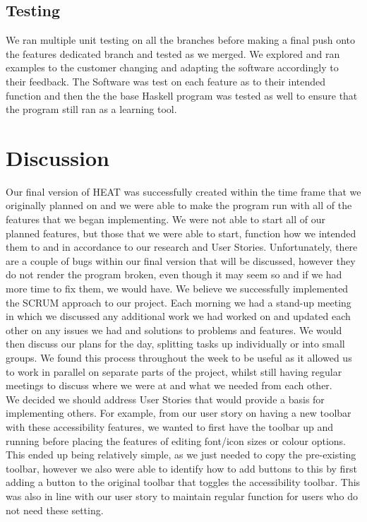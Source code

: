 \subsection{\textbf{Testing}}

We ran multiple unit testing on all the branches before making a final push onto the features dedicated branch and tested as we merged. We explored and ran examples to the customer changing and adapting the software accordingly to their feedback. The Software was test on each feature as to their intended function and then the the base Haskell program was tested as well to ensure that the program still ran as a learning tool.


\section{\textbf{Discussion}}

Our final version of HEAT was successfully created within the time frame that we originally planned on and we were able to make the program run with all of the features that we began implementing. We were not able to start all of our planned features, but those that we were able to start, function how we intended them to and in accordance to our research and User Stories. Unfortunately, there are a couple of bugs within our final version that will be discussed, however they do not render the program broken, even though it may seem so and if we had more time to fix them, we would have. We believe we successfully implemented the SCRUM approach to our project. Each morning we had a stand-up meeting in which we discussed any additional work we had worked on and updated each other on any issues we had and solutions to problems and features. We would then discuss our plans for the day, splitting tasks up individually or into small groups. We found this process throughout the week to be useful as it allowed us to work in parallel on separate parts of the project, whilst still having regular meetings to discuss where we were at and what we needed from each other.  \\

We decided we should address User Stories that would provide a basis for implementing others. For example, from our user story on having a new toolbar with these accessibility features, we wanted to first have the toolbar up and running before placing the features of editing font/icon sizes or colour options. This ended up being relatively simple, as we just needed to copy the pre-existing toolbar, however we also were able to identify how to add buttons to this by first adding a button to the original toolbar that toggles the accessibility toolbar. This was also in line with our user story to maintain regular function for users who do not need these setting. \\

